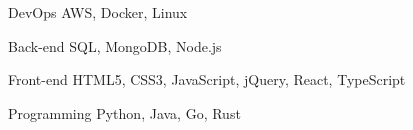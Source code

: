 

\begin{cvskills}

  \cvskill
    {DevOps} %
    {AWS, Docker, Linux} %

  \cvskill
    {Back-end} %
    {SQL, MongoDB, Node.js} %

  \cvskill
    {Front-end} %
    {HTML5, CSS3, JavaScript, jQuery, React, TypeScript} %

  \cvskill
    {Programming} %
    {Python, Java, Go, Rust} %

\end{cvskills}
